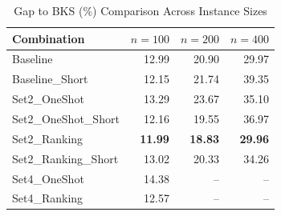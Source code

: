 \documentclass{article}
\begin{document}
\begin{table}[htbp]
\centering
\caption{Gap to BKS (\%) Comparison Across Instance Sizes}
\label{tab:combined_gap_to_bks_pct}
\begin{tabular}{lrrr}
\toprule
Combination & $n=100$ & $n=200$ & $n=400$ \\
\midrule
Baseline & 12.99 & 20.90 & 29.97 \\
Baseline\_Short & 12.15 & 21.74 & 39.35 \\
Set2\_OneShot & 13.29 & 23.67 & 35.10 \\
Set2\_OneShot\_Short & 12.16 & 19.55 & 36.97 \\
Set2\_Ranking & \textbf{11.99} & \textbf{18.83} & \textbf{29.96} \\
Set2\_Ranking\_Short & 13.02 & 20.33 & 34.26 \\
Set4\_OneShot & 14.38 & -- & -- \\
Set4\_Ranking & 12.57 & -- & -- \\
\bottomrule
\end{tabular}
\end{table}
\end{document}

